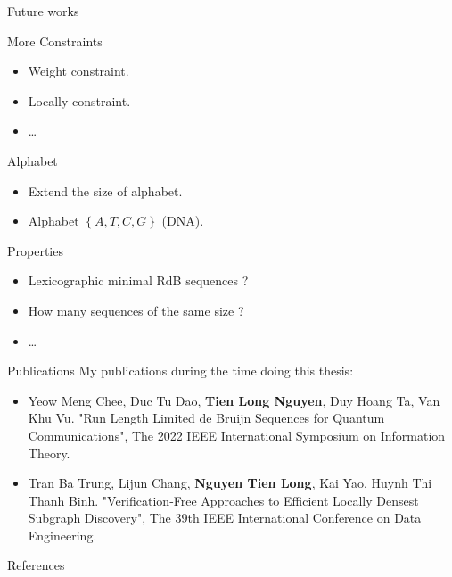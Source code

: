 \begin{frame}{Future works}
    \begin{block}{More Constraints}
        \begin{itemize}
            \item Weight constraint.
            \item Locally constraint.
            \item \dots
        \end{itemize}
    \end{block}
    
    \begin{block}{Alphabet}
        \begin{itemize}
            \item Extend the size of alphabet.
            \item Alphabet $\left\{A,T,C,G\right\}$ (DNA).
        \end{itemize}
    \end{block}
    
    \begin{block}{Properties}
        \begin{itemize}
            \item Lexicographic minimal RdB sequences ?
            \item How many sequences of the same size ?
            \item \dots
        \end{itemize}
    \end{block}
\end{frame}

\begin{frame}{Publications}
    My publications during the time doing this thesis:
    \begin{itemize}
        \item Yeow Meng Chee, Duc Tu Dao, \textbf{Tien Long Nguyen}, Duy Hoang Ta, Van Khu Vu. "Run Length Limited de Bruijn Sequences for Quantum Communications", The 2022 IEEE International Symposium on Information Theory.
        \item Tran Ba Trung, Lijun Chang, \textbf{Nguyen Tien Long}, Kai Yao, Huynh Thi Thanh Binh. "Verification-Free Approaches to Efficient Locally Densest Subgraph Discovery", The 39th IEEE International Conference on Data Engineering.
    \end{itemize}
\end{frame}

\begin{frame}[allowframebreaks]{References}
    \printbibliography
\end{frame}